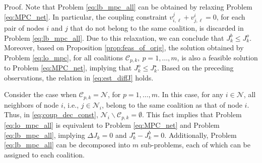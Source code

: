 \begin{pf*}{Proof.}
	Note that Problem \eqref{eq:lb_mpc_all} can be obtained by relaxing Problem \eqref{eq:MPC_net}. In particular, the coupling constraint $v_{i,\ell}^j + v_{j,\ell}^i=0$, for each pair of nodes $i$ and $j$ that do not belong to the same coalition, is discarded in Problem \eqref{eq:lb_mpc_all}. Due to this relaxation, we can conclude that $J^b_k \leq J^o_k$. Moreover, based on Proposition \ref{prop:feas_of_orig}, the solution obtained by Problem \eqref{eq:lo_mpc}, for all coalitions $\mathcal{C}_{p,k}, \ p=1,\dots,m$, is also a feasible solution to Problem \eqref{eq:MPC_net}, implying that $J^o_k \leq J^{\star}_k$. Based on the preceding observations, the relation in \eqref{eq:est_diffJ} holds. \eod
\end{pf*}
\begin{rem}
	\label{re:tight_bound}
	Consider the case when $\mathcal{C}_{p,k}=\mathcal{N}$, for $p=1,\dots,m$. In this case, for any $i\in \mathcal{N}$, all neighbors of node $i$, i.e., $j\in\mathcal{N}_i$, belong to the same coalition as that of node $i$. Thus, in \eqref{eq:coup_dec_const},  $\mathcal{N}_i\backslash\mathcal{C}_{p,k}=\emptyset$. This fact implies that Problem \eqref{eq:lo_mpc_all} is equivalent to Problem \eqref{eq:MPC_net} and Problem \eqref{eq:lb_mpc_all}, implying   $\Delta J_k=0$ and $J^{\star}_k-J^b_k=0$. Additionally, Problem \eqref{eq:lb_mpc_all} can be decomposed into {$m$ sub-problems, each of which can be assigned to each coalition}.\eod
\end{rem}

